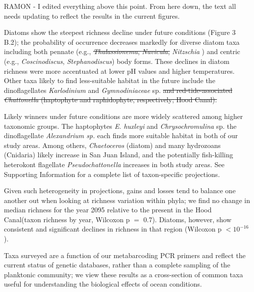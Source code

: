 \documentclass[11pt]{article}
\begin{document}
\begin{linenumbers}
{\color{red} RAMON - I edited everything above this point. From here down, the text all needs updating to reflect the results in the current figures. }

Diatoms show the steepest richness decline under future conditions (Figure 3 B.2); the probability of occurrence decreases markedly for diverse diatom taxa including both pennate (e.g., {\color{red} \st{\textit{Thalassionema}, \textit{Navicula},}} \textit{Nitzschia} ) and centric (e.g., \textit{Coscinodiscus},  {\color{red} \textit{Stephanodiscus}}) body forms. These declines in diatom richness were more accentuated at lower pH values{\color{red} and higher temperatures}. Other taxa likely to find less-suitable habitat in the future include the dinoflagellates {\color{red}\textit{Karlodinium} and \textit{Gymnodiniaceae} sp.\st{ and red-tide-associated \textit{Chattonella} (haptophyte and raphidophyte, respectively; Hood Canal).} }

Likely winners under future conditions are more widely scattered among higher taxonomic groups. The haptophytes \textit{E. huxleyi} and \textit{Chrysochromulina} sp. the dinoflagellate \textit{Alexandrium sp.} each finds more suitable habitat in both of our study areas. Among others, \textit{Chaetoceros} (diatom) and {\color{red} many} hydrozoans (Cnidaria) likely increase in San Juan Island, and the potentially fish-killing heterokont flagellate \textit{Pseudochattonella} increases in {\color{red} both study areas}. See Supporting Information for a complete list of taxon-specific projections.
 
Given such heterogeneity in projections, gains and losses tend to balance one another out when looking at richness variation within phyla; {\color{red} we find no change in median richness for the year 2095 relative to the present in the Hood Canal(taxon richness  by year, Wilcoxon p $=$ 0.7). Diatoms, however, show consistent and significant declines in richness in that region (Wilcoxon p $< 10^{-16}$). }

Taxa surveyed are a function of our metabarcoding PCR primers \cite{leray_new_2013} and reflect the current status of genetic databases, rather than a complete sampling of the planktonic community; we view these results as a cross-section of common taxa useful for understanding the biological effects of ocean conditions.
 


\end{linenumbers}
\end{document}
